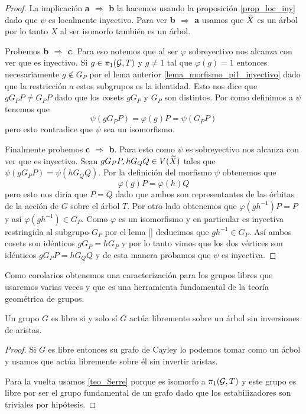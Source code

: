 \documentclass[tesis.tex]{subfiles}
\begin{document}
\begin{proof}	
		 La implicación \textbf{a $\Rightarrow$ b} la hacemos usando la proposición \ref{prop_loc_iny} dado que $\psi$ es localmente inyectivo.
		 Para ver \textbf{b $\Rightarrow$ a} usamos que $\widetilde X$ es un árbol por lo tanto $X$ al ser isomorfo también es un árbol.
		 
		 Probemos \textbf{b $\Rightarrow$ c}. 
		 Para eso notemos que al ser $\varphi$ sobreyectivo nos alcanza con ver que es inyectivo.
		 Si $g \in \pi_1({\cal G}, T)$ y $g \neq 1$ tal que $\varphi(g)= 1$ entonces necesariamente $g \notin G_P$ por el lema anterior \ref{lema_morfismo_pi1_inyectivo} dado que la restricción a estos subgrupos es la identidad.
		 Esto nos dice que $g G_P P \neq G_P P$ dado que los cosets $gG_P$ y $G_P$ son distintos. Por como definimos a $\psi$ tenemos que 
		 \[
		 \psi (gG_P P) = \varphi(g) P  = \psi(G_P P)
		 \] 
		 pero esto contradice que $\psi$ sea un isomorfismo.
		 
		 Finalmente probemos \textbf{c $\Rightarrow$ b}. 
		 Para esto como $\psi$ es sobreyectivo nos alcanza con ver que es inyectivo.
		 Sean $gG_PP, hG_QQ \in V(\widetilde X)$ tales que $\psi(gG_PP) = \psi(hG_QQ)$.
		 Por la definición del morfismo $\psi$ obtenemos que 
		 \[
		 	\varphi(g)P = \varphi(h)Q
		 \]
		 pero esto nos diría que $P = Q$ dado que ambos son representantes de las órbitas de la acción de $G$ sobre el árbol $T$. 
		 Por otro lado obtenemos que $\varphi(g h^{-1}) P  =  P$ y así $\varphi(gh^{-1}) \in G_P$. 
		 Como $\varphi$ es un isomorfismo y en particular es inyectiva restringida al subgrupo $G_P$ por el lema \ref{} deducimos que $gh^{-1} \in G_P$.
		 Así ambos cosets son idénticos $g G_P = h G_P$ y por lo tanto vimos que los dos vértices son idénticos $gG_PP  = hG_QQ$ y de esta manera probamos que $\psi$ es inyectiva.
\end{proof}

Como corolarios obtenemos una caracterización para los grupos libres que usaremos varias veces y que es una herramienta fundamental de la teoría geométrica de grupos.

\begin{coro}\label{coro_libre_sii_actua_arbol}
	Un grupo $G$ es libre si y solo sí $G$ actúa libremente sobre un árbol sin inversiones de aristas. 
\end{coro}
\begin{proof}
	Si $G$ es libre entonces su grafo de Cayley lo podemos tomar como un árbol y usamos que actúa libremente sobre él sin invertir aristas.
	
	Para la vuelta usamos \ref{teo_Serre} porque es isomorfo a $\pi_1({\cal G}, T)$ y este grupo es libre por ser el grupo fundamental de un grafo dado que los estabilizadores son triviales por hipótesis.
\end{proof}
\end{document}
